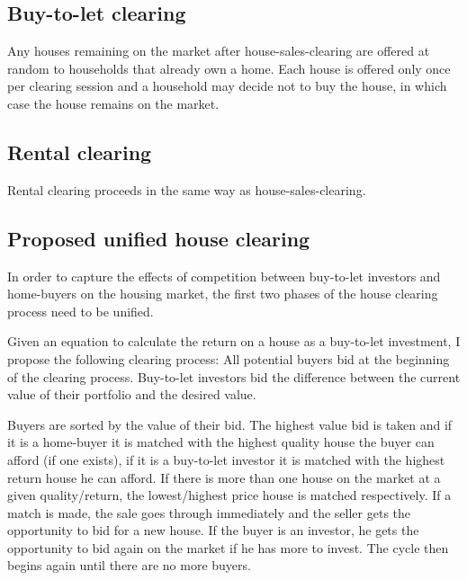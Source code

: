 \documentclass[a4paper]{article}
\begin{document}
\subsection{Buy-to-let clearing}
Any houses remaining on the market after house-sales-clearing are offered at random to households that already own a home. Each house is offered only once per clearing session and a household may decide not to buy the house, in which case the house remains on the market.

\subsection{Rental clearing}

Rental clearing proceeds in the same way as house-sales-clearing.

\subsection{Proposed unified house clearing}
In order to capture the effects of competition between buy-to-let investors and home-buyers on the housing market, the first two phases of the house clearing process need to be unified.

Given an equation to calculate the return on a house as a buy-to-let investment, I propose the following clearing process: All potential buyers bid at the beginning of the clearing process. Buy-to-let investors bid the difference between the current value of their portfolio and the desired value.

Buyers are sorted by the value of their bid. The highest value bid is taken and if it is a home-buyer it is matched with the highest quality house the buyer can afford (if one exists), if it is a buy-to-let investor it is matched with the highest return house he can afford. If there is more than one house on the market at a given quality/return, the lowest/highest price house is matched respectively. If a match is made, the sale goes through immediately and the seller gets the opportunity to bid for a new house. If the buyer is an investor, he gets the opportunity to bid again on the market if he has more to invest. The cycle then begins again until there are no more buyers.

\end{document}
